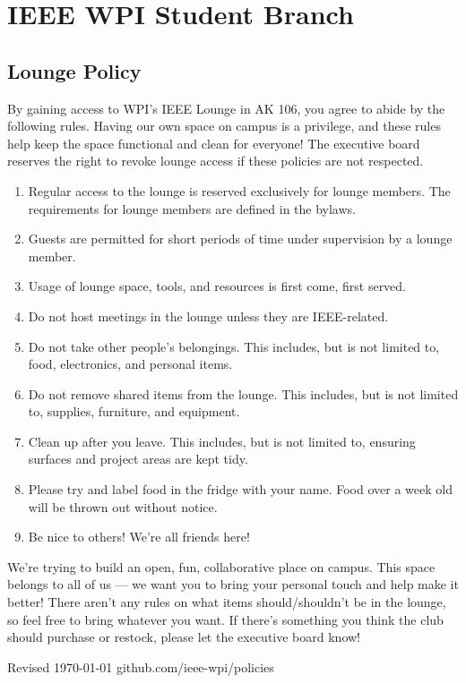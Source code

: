 \documentclass[12pt]{report}
\begin{document}
\section*{IEEE WPI Student Branch}
\subsection*{Lounge Policy}
By gaining access to WPI's IEEE Lounge in AK 106, you agree to abide by the following rules. Having our own space on campus is a privilege, and these rules help keep the space functional and clean for everyone! The executive board reserves the right to revoke lounge access if these policies are not respected.

\begin{enumerate}
    \item{Regular access to the lounge is reserved exclusively for lounge members. The requirements for lounge members are defined in the bylaws.}
    \item{Guests are permitted for short periods of time under supervision by a lounge member.}
    \item{Usage of lounge space, tools, and resources is first come, first served.}
    \item{Do not host meetings in the lounge unless they are IEEE-related.}
    \item{Do not take other people's belongings. This includes, but is not limited to, food, electronics, and personal items.}
    \item{Do not remove shared items from the lounge. This includes, but is not limited to, supplies, furniture, and equipment.}
    \item{Clean up after you leave. This includes, but is not limited to, ensuring surfaces and project areas are kept tidy.}
    \item{Please try and label food in the fridge with your name.  Food over a week old will be thrown out without notice.}
    \item{Be nice to others! We're all friends here! \Large\smiley{}}
\end{enumerate}

\noindent We're trying to build an open, fun, collaborative place on campus. This space belongs to all of us — we want you to bring your personal touch and help make it better! There aren't any rules on what items should/shouldn't be in the lounge, so feel free to bring whatever you want. If there's something you think the club should purchase or restock, please let the executive board know!

\vspace{\fill}
\noindent \normalsize{Revised \today}
\hspace{\fill}
github.com/ieee-wpi/policies
\end{document}
